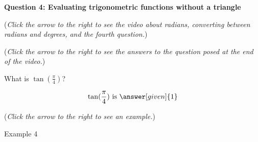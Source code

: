 \documentclass{ximera}
\begin{document}
\textbf{Question 4: Evaluating trigonometric functions
without a triangle}
\begin{question}
\begin{flushright}
{\color{blue}(\emph{Click the arrow to the right to see the video about radians, converting between radians and degrees, and the fourth question.})}
\end{flushright}
\begin{center}
\begin{expandable}
{\color{blue}(\emph{Click the arrow to the right to see the answers 
to the question posed at the end of the video.})}
\begin{expandable}
What is $\tan(\frac{\pi}{4})$?
\begin{prompt}
\[
\tan(\frac{\pi}{4})\text{ is }\answer[given]{1}
\]
\end{prompt}
\begin{flushright}
{\color{blue}(\emph{Click the arrow to the right to see an example.})}
\end{flushright}
\begin{expandable}
Example 4
\end{expandable}
\end{expandable}
\end{expandable}
\end{center}
\end{question}
\end{document}
